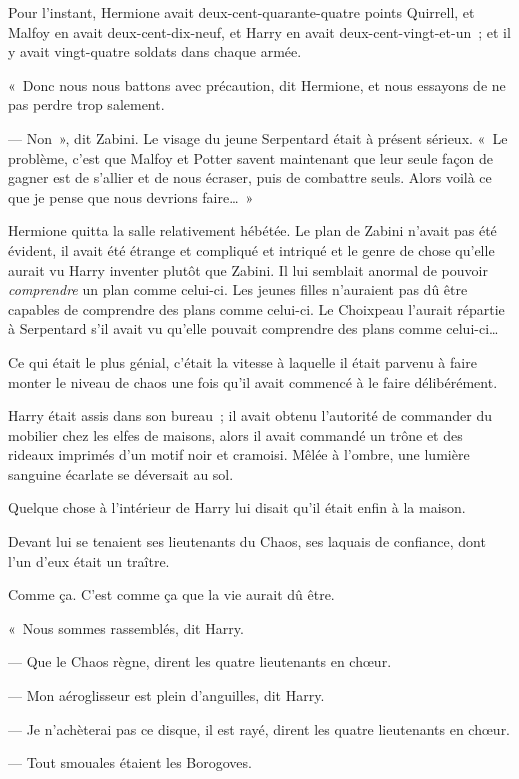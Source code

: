 Pour l'instant, Hermione avait deux-cent-quarante-quatre points Quirrell, et Malfoy en avait deux-cent-dix-neuf, et Harry en avait deux-cent-vingt-et-un~; et il y avait vingt-quatre soldats dans chaque armée.

«~Donc nous nous battons avec précaution, dit Hermione, et nous essayons de ne pas perdre trop salement.

--- Non~», dit Zabini. Le visage du jeune Serpentard était à présent sérieux. «~Le problème, c'est que Malfoy et Potter savent maintenant que leur seule façon de gagner est de s'allier et de nous écraser, puis de combattre seuls. Alors voilà ce que je pense que nous devrions faire…~»

Hermione quitta la salle relativement hébétée. Le plan de Zabini n'avait pas été évident, il avait été étrange et compliqué et intriqué et le genre de chose qu'elle aurait vu Harry inventer plutôt que Zabini. Il lui semblait anormal de pouvoir \emph{comprendre} un plan comme celui-ci. Les jeunes filles n'auraient pas dû être capables de comprendre des plans comme celui-ci. Le Choixpeau l'aurait répartie à Serpentard s'il avait vu qu'elle pouvait comprendre des plans comme celui-ci…

\later

Ce qui était le plus génial, c'était la vitesse à laquelle il était parvenu à faire monter le niveau de chaos une fois qu'il avait commencé à le faire délibérément.

Harry était assis dans son bureau~; il avait obtenu l'autorité de commander du mobilier chez les elfes de maisons, alors il avait commandé un trône et des rideaux imprimés d'un motif noir et cramoisi. Mêlée à l'ombre, une lumière sanguine écarlate se déversait au sol.

Quelque chose à l'intérieur de Harry lui disait qu'il était enfin à la maison.

Devant lui se tenaient ses lieutenants du Chaos, ses laquais de confiance, dont l'un d'eux était un traître.

Comme ça. C'est comme ça que la vie aurait dû être.

«~Nous sommes rassemblés, dit Harry.

--- Que le Chaos règne, dirent les quatre lieutenants en chœur.

--- Mon aéroglisseur est plein d'anguilles, dit Harry.

--- Je n'achèterai pas ce disque, il est rayé, dirent les quatre lieutenants en chœur.

--- Tout smouales étaient les Borogoves.

